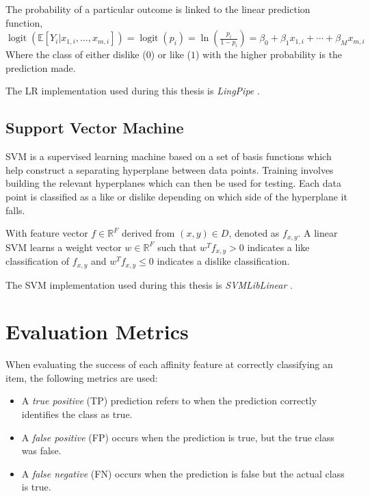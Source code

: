 The probability of a particular outcome is linked to the linear prediction function, 
$\operatorname{logit}(\mathbb{E}[Y_i|x_{1,i},\ldots,x_{m,i}]) = \operatorname{logit}(p_i)=\ln\left(\frac{p_i}{1-p_i}\right) = \beta_0 + \beta_1 x_{1,i} + \cdots + \beta_M x_{m,i}$
Where the class of either dislike ($0$) or like ($1$) with the higher probability is the prediction made.

The LR implementation used during this thesis is \emph{LingPipe} \cite{lin}.

\subsection{Support Vector Machine}
\label{sec:svm}

SVM is a supervised learning machine based on a set of basis functions which help construct 
a separating hyperplane between data points. Training involves building the relevant hyperplanes which can then be used for testing. 
Each data point is classified as a like or dislike depending on which side of the hyperplane it falls.

With feature vector $f \in \mathbb{R}^F$ derived from $(x,y) \in D$, denoted as $f_{x,y}$. A linear SVM learns a weight vector $w \in \mathbb{R}^F$
such that $w^T f_{x,y} > 0$ indicates a like classification of $f_{x,y}$ and $w^T f_{x,y} \leq 0$ indicates a dislike classification.

The SVM implementation used during this thesis is \emph{SVMLibLinear} \cite{cjlin}.

\section{Evaluation Metrics}
\label{sec:notation}

When evaluating the success of each affinity feature at correctly classifying an item, the following metrics are used:

\begin{itemize}
\item A \emph{true positive} (TP) prediction refers to when the prediction correctly identifies the class as true. 
\item A \emph{false positive} (FP) occurs when the prediction is true, but the true class was false.
\item A \emph{false negative} (FN) occurs when the prediction is false but the actual class is true.
\end{itemize}

